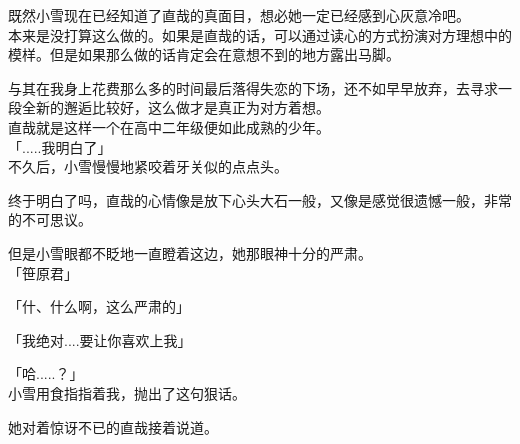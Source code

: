 既然小雪现在已经知道了直哉的真面目，想必她一定已经感到心灰意冷吧。\\

本来是没打算这么做的。如果是直哉的话，可以通过读心的方式扮演对方理想中的模样。但是如果那么做的话肯定会在意想不到的地方露出马脚。

与其在我身上花费那么多的时间最后落得失恋的下场，还不如早早放弃，去寻求一段全新的邂逅比较好，这么做才是真正为对方着想。\\

直哉就是这样一个在高中二年级便如此成熟的少年。\\

「.....我明白了」\\

不久后，小雪慢慢地紧咬着牙关似的点点头。

终于明白了吗，直哉的心情像是放下心头大石一般，又像是感觉很遗憾一般，非常的不可思议。

但是小雪眼都不眨地一直瞪着这边，她那眼神十分的严肃。\\

「笹原君」

「什、什么啊，这么严肃的」

「我绝对....要让你喜欢上我」

「哈.....？」\\

小雪用食指指着我，抛出了这句狠话。

她对着惊讶不已的直哉接着说道。\\

